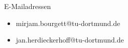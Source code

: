 \begin{frame}[t]{E-Mailadressen}
    \begin{itemize}
        \item mirjam.bourgett@tu-dortmund.de 
        \item jan.herdieckerhoff@tu-dortmund.de 
    \end{itemize}
\end{frame}
